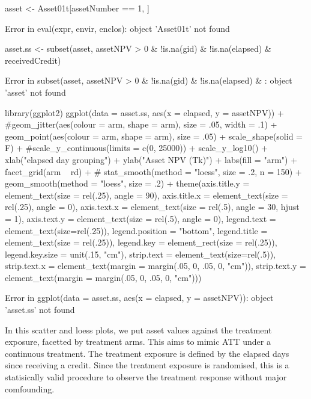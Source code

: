 \begin{Schunk}
\begin{Sinput}
asset <- Asset01t[assetNumber == 1, ]
\end{Sinput}
\begin{Soutput}
Error in eval(expr, envir, enclos): object 'Asset01t' not found
\end{Soutput}
\begin{Sinput}
asset.ss <- subset(asset, assetNPV > 0 & !is.na(gid) & !is.na(elapsed) & receivedCredit)
\end{Sinput}
\begin{Soutput}
Error in subset(asset, assetNPV > 0 & !is.na(gid) & !is.na(elapsed) & : object 'asset' not found
\end{Soutput}
\begin{Sinput}
library(ggplot2)
ggplot(data = asset.ss, aes(x = elapsed, y = assetNPV)) +
	#geom_jitter(aes(colour = arm, shape = arm), size = .05, width = .1) + 
	geom_point(aes(colour = arm, shape = arm), size = .05) + 
	scale_shape(solid = F) +
	#scale_y_continuous(limits = c(0, 25000)) + 
	scale_y_log10() +
	xlab("elapsed day grouping") + ylab("Asset NPV (Tk)") + labs(fill = "arm") +
	facet_grid(arm ~ rd) + 
#	stat_smooth(method = "loess", size = .2, n = 150) +
	geom_smooth(method = "loess", size = .2) +
	theme(axis.title.y = element_text(size = rel(.25), angle = 90), 
		axis.title.x = element_text(size = rel(.25), angle = 0),
		axis.text.x = element_text(size = rel(.5), angle = 30, hjust = 1),
		axis.text.y = element_text(size = rel(.5), angle = 0),
		legend.text = element_text(size=rel(.25)), 
		legend.position = "bottom", 
		legend.title = element_text(size = rel(.25)),
		legend.key = element_rect(size = rel(.25)),
		legend.key.size = unit(.15, "cm"),
		strip.text = element_text(size=rel(.5)),
		strip.text.x = element_text(margin = margin(.05, 0, .05, 0, "cm")),
		strip.text.y = element_text(margin = margin(.05, 0, .05, 0, "cm")))
\end{Sinput}
\begin{Soutput}
Error in ggplot(data = asset.ss, aes(x = elapsed, y = assetNPV)): object 'asset.ss' not found
\end{Soutput}
\end{Schunk}
In this scatter and loess plots, we put asset values against the treatment exposure, facetted by treatment arms. This aims to mimic ATT under a continuous treatment. The treatment exposure is defined by the elapsed days since receiving a credit. Since the treatment exposure is randomised, this is a statisically valid procedure to observe the treatment response without major comfounding.

